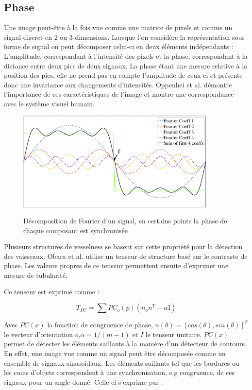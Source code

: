 \subsection{Phase}
\label{sec:EA:rehaussement:Phase}

Une image peut-être à la fois vue comme une matrice de pixels et comme un signal discret en 2 ou 3 dimensions. Lorsque l'on considère la représentation sous forme de signal on peut décomposer celui-ci en deux éléments indépendants : L'amplitude, correspondant à l'intensité des pixels et la phase, correspondant à la distance entre deux pics de deux signaux. La phase étant une mesure relative à la position des pics, elle ne prend pas en compte l'amplitude de ceux-ci et présente donc une invariance aux changements d'intensités. Oppenhei et al. \cite{Oppenheim1981_phase_importance} démontre l'importance de ces caractéristiques de l'image et montre une correspondance avec le système visuel humain. 

\begin{figure}
  \centering
  \includegraphics[height=5cm]{Images/PC_decomposition.png}
  \label{fig:phase congruency}
  \caption{Décomposition de Fourier d'un signal, en certains points la phase de chaque composant est synchronisée}
\end{figure}

Plusieurs structures de vesselness se basent sur cette propriété pour la détection des vaisseaux. Obara et al. \cite{Obara2012_phase} utilise un tenseur de structure basé sur le contraste de phase. Les valeurs propres de ce tenseur permettent ensuite d'exprimer une mesure de tubularité.

Ce tenseur est exprimé comme :

\begin{equation}
  T_{PC} = \sum PC_{o}(p)(n_{o}n^T - \alpha \text{I})
\end{equation}

Avec $PC(x)$ la fonction de congruence de phase, $n(\theta)=[cos(\theta),sin(\theta)]^T$ le vecteur d'orientation $o$,$\alpha = 1/(m-1)$ et $I$ le tenseur unitaire. $PC(x)$ permet de détecter les éléments saillants à la manière d'un détecteur de contours.
En effet, une image vue comme un signal peut être décomposée comme un ensemble de signaux sinusoïdaux. Les éléments saillants tel que les bordures ou les coins d'objets correspondent à une synchronisation, e.g congruence, de ces signaux pour un angle donné. Celle-ci s'exprime par :

